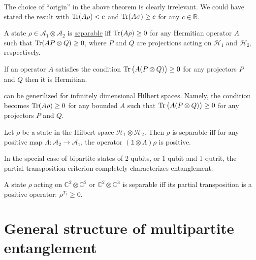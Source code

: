 \documentclass[12pt]{report}
\begin{document}
\begin{remark}
	The choice of ``origin'' in the above theorem is clearly irrelevant.
	We could have stated the result with $\Tr(A\rho) < c$ and
	$\Tr(A\sigma) \ge c$ for any $c \in \mathbb R$.
\end{remark}

\begin{lemma}
	A state $\rho \in \mathcal A_1 \otimes \mathcal A_2$ is \uline{separable} iff
	$\Tr(A\rho) \ge 0$
	for any Hermitian operator $A$ such that
	$\Tr(A P\otimes Q) \ge 0$, where $P$ and $Q$ are projections acting on
	$\mathcal H_1$ and $\mathcal H_2$, respectively.
	\label{lemma:horodecki96_separable_iff_TrArhoPositive}
\end{lemma}

\begin{remark}
	If an operator $A$ satisfies the condition $\Tr\big( A(P \otimes Q) \big) \ge 0$
	for any projectors $P$ and $Q$ then it is Hermitian.
\end{remark}

\begin{remark}
	 can be generilized for infinitely dimensional Hilbert spaces.
	Namely, the condition becomes $\Tr(A\rho) \ge 0$ for any bounded $A$ such that
	$\Tr\big( A(P\otimes Q) \big) \ge 0$ for any projectors $P$ and $Q$.
\end{remark}

\begin{thm}
	Let $\rho$ be a state in the Hilbert space $\mathcal H_1 \otimes \mathcal H_2$.
	Then $\rho$ is separable iff for any positive map
	$\Lambda : \mathcal A_2 \to \mathcal A_1$,
	the operator $(\mathds1 \otimes \Lambda)\rho$ is positive.
\end{thm}

In the special case of bipartite states of 2 qubits, or 1 qubit and 1 qutrit,
the partial transposition criterion completely characterizes entanglement:
\begin{thm}
	A state $\rho$ acting on $\mathbb C^2 \otimes \mathbb C^2$
	or $\mathbb C^2 \otimes \mathbb C^3$ is separable iff
	its partial transposition is a positive operator: $\rho^{T_1} \ge 0$.
\end{thm}

\section{General structure of multipartite entanglement}
\end{document}
